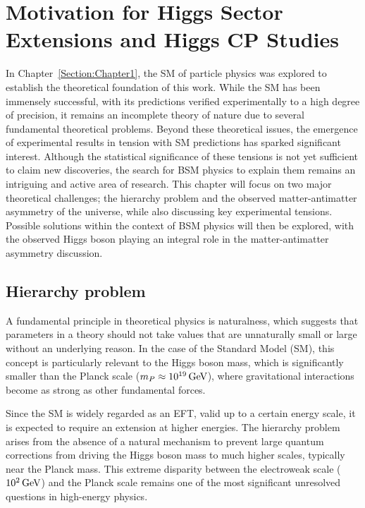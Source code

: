 \chapter{Motivation for Higgs Sector Extensions and Higgs CP Studies}
\thispagestyle{plain}  %
\pagestyle{chapterpages}
\label{Section:Chapter2}

In Chapter~\ref{Section:Chapter1}, the SM of particle physics was explored to establish the theoretical foundation of this work. While the SM has been immensely successful, with its predictions verified experimentally to a high degree of precision, it remains an incomplete theory of nature due to several fundamental theoretical problems. Beyond these theoretical issues, the emergence of experimental results in tension with SM predictions has sparked significant interest. Although the statistical significance of these tensions is not yet sufficient to claim new discoveries, the search for BSM physics to explain them remains an intriguing and active area of research. This chapter will focus on two major theoretical challenges; the hierarchy problem and the observed matter-antimatter asymmetry of the universe, while also discussing key experimental tensions. Possible solutions within the context of BSM physics will then be explored, with the observed Higgs boson playing an integral role in the matter-antimatter asymmetry discussion.

\section{Hierarchy problem}

A fundamental principle in theoretical physics is naturalness, which suggests that parameters in a theory should not take values that are unnaturally small or large without an underlying reason. In the case of the Standard Model (SM), this concept is particularly relevant to the Higgs boson mass, which is significantly smaller than the Planck scale ($m_P \approx 10^{19} \,\text{Ge\hspace{-.08em}V}$), where gravitational interactions become as strong as other fundamental forces.

Since the SM is widely regarded as an \ac{EFT}, valid up to a certain energy scale, it is expected to require an extension at higher energies. The hierarchy problem arises from the absence of a natural mechanism to prevent large quantum corrections from driving the Higgs boson mass to much higher scales, typically near the Planck mass. This extreme disparity between the electroweak scale ($10^2 \,\text{Ge\hspace{-.08em}V}$) and the Planck scale remains one of the most significant unresolved questions in high-energy physics.

